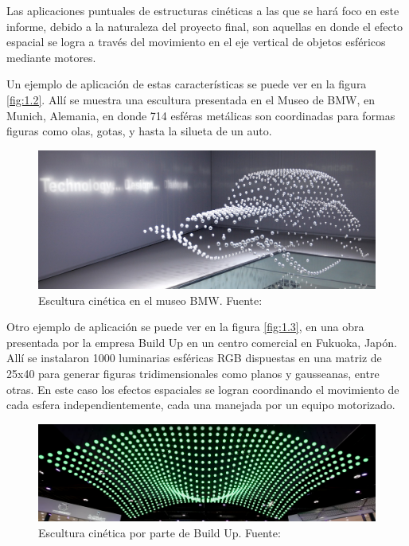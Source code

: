 Las aplicaciones puntuales de estructuras cinéticas a las que se hará foco en este informe, debido a la naturaleza del proyecto final, son aquellas en donde el efecto espacial se logra a través del movimiento en el eje vertical de objetos esféricos mediante motores. 

Un ejemplo de aplicación de estas características se puede ver en la figura \ref{fig:1.2}. Allí se muestra una escultura presentada en el Museo de BMW, en Munich, Alemania, en donde 714 esféras metálicas son coordinadas para formas figuras como olas, gotas, y hasta la silueta de un auto.

\begin{figure}[!ht]
	\centering
	\includegraphics[width=15cm,scale=1]{resources/1_2-kinSculp.png}
	\caption{ Escultura cinética en el museo BMW. Fuente: \cite{fig1_2} }
	\label{fig:\thefigure}
\end{figure}

Otro ejemplo de aplicación se puede ver en la figura \ref{fig:1.3}, en una obra presentada por la empresa Build Up en un centro comercial en Fukuoka, Japón. Allí se instalaron 1000 luminarias esféricas RGB dispuestas en una matriz de 25x40 para generar figuras tridimensionales como planos y gausseanas, entre otras. En este caso los efectos espaciales se logran coordinando el movimiento de cada esfera independientemente, cada una manejada por un equipo motorizado.
\begin{figure}[!ht]
	\centering
	\includegraphics[width=15cm,scale=1]{resources/1_3-kinSculp.png}
	\caption{ Escultura cinética por parte de Build Up. Fuente: \cite{fig1_3} }
	\label{fig:\thefigure}
\end{figure}

